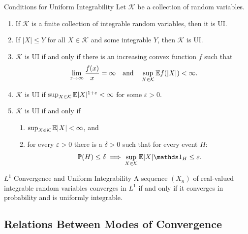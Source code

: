 \begin{prop}{Conditions for Uniform Integrability}{}
	Let \(\mathcal{K}\) be a collection of random variables.
	\begin{enumerate}
		\item If \(\mathcal{K}\) is a finite collection of integrable random variables, then it is UI.
		\item If \(|X| \le Y\) for all \(X \in \mathcal{K}\) and some integrable \(Y\), then \(\mathcal{K}\) is UI.
		\item \(\mathcal{K}\) is UI if and only if there is an increasing convex function \(f\) such that
		      \begin{equation*}
			      \lim_{x \to \infty} \frac{f(x)}{x} = \infty \quad \text{and} \quad \sup_{X \in \mathcal{K}} \mathbb{E} f(|X|) < \infty.
		      \end{equation*}
		\item \(\mathcal{K}\) is UI if \(\sup_{X \in \mathcal{K}} \mathbb{E} |X|^{1+\varepsilon} < \infty\) for some \(\varepsilon > 0\).
		\item \(\mathcal{K}\) is UI if and only if
		      \begin{enumerate}
			      \item \(\sup_{X \in \mathcal{K}} \mathbb{E} |X| < \infty\), and
			      \item for every \(\varepsilon > 0\) there is a \(\delta > 0\) such that for every event \(H\):
			            \begin{equation}
				            \Prob(H) \le \delta \implies \sup_{X \in \mathcal{K}} \E |X| \I_{H} \le \varepsilon.
				            \label{eq:UniformIntegrabilityEquivalence}
			            \end{equation}
		      \end{enumerate}
	\end{enumerate}
\end{prop}

\begin{thm}{\(L^1\) Convergence and Uniform Integrability}{}
	A sequence \((X_n)\) of real-valued integrable random variables converges in \(L^1\) if and only if it converges in probability and is uniformly integrable.
\end{thm}

\subsection{Relations Between Modes of Convergence}

